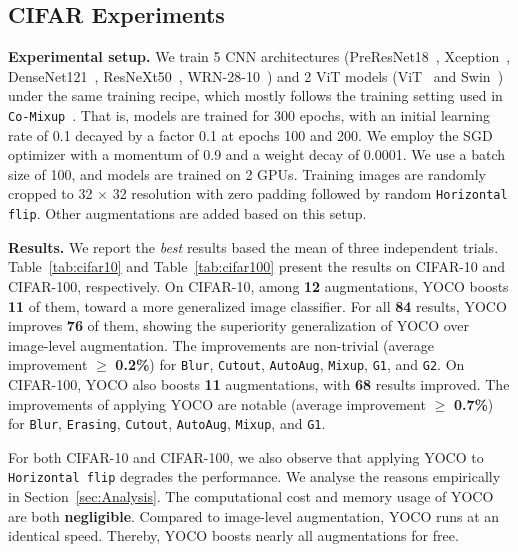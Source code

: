 \documentclass{article}
\begin{document}
\subsection{CIFAR Experiments}
\textbf{Experimental setup.} We train 5 CNN architectures (PreResNet18~\cite{he2016identity}, Xception~\cite{chollet2017xception}, DenseNet121~\cite{huang2017densely}, ResNeXt50~\cite{Xie2017}, WRN-28-10~\cite{Zagoruyko2016WRN}) and 2 ViT models (ViT~\cite{dosovitskiy2020image} and Swin~\cite{liu2021swin}) under the same training recipe, which mostly follows the training setting used in \texttt{Co-Mixup}~\cite{kim2021co}. That is, models are trained for 300 epochs, with an initial learning rate of 0.1 decayed by a factor 0.1 at epochs 100 and 200. We employ the SGD optimizer with a momentum of 0.9 and a weight decay of 0.0001. We use a batch size of 100, and models are trained on 2 GPUs. Training images are randomly cropped to 32 $\times$ 32 resolution with zero padding followed by random \texttt{Horizontal flip}. Other augmentations are added based on this setup. 




\textbf{Results.}
We report the \textit{best} results based the mean of three independent trials.
Table~\ref{tab:cifar10} and Table~\ref{tab:cifar100} present the results on CIFAR-10 and CIFAR-100, respectively. On CIFAR-10, among \textbf{12} augmentations, YOCO boosts \textbf{11} of them, toward a more generalized image classifier. For all \textbf{84} results, YOCO improves\textbf{ 76 }of them, showing the superiority generalization of YOCO over image-level augmentation. The improvements are non-trivial (average improvement $\geq$\textbf{ 0.2\%}) for \texttt{Blur}, \texttt{Cutout}, \texttt{AutoAug}, \texttt{Mixup}, \texttt{G1}, and \texttt{G2}.
On CIFAR-100, YOCO also boosts \textbf{11} augmentations, with\textbf{ 68 }results improved. The improvements of applying YOCO are notable (average improvement $\geq$ \textbf{0.7\%}) for \texttt{Blur}, \texttt{Erasing}, \texttt{Cutout}, \texttt{AutoAug}, \texttt{Mixup}, and \texttt{G1}. 

For both CIFAR-10 and CIFAR-100, we also observe that applying YOCO to \texttt{Horizontal flip} degrades the performance. We analyse the reasons empirically in Section~\ref{sec:Analysis}. The computational cost and memory usage of YOCO are both \textbf{negligible}. Compared to image-level augmentation, YOCO runs at an identical speed. Thereby, YOCO boosts nearly all augmentations for free. 
\end{document}
